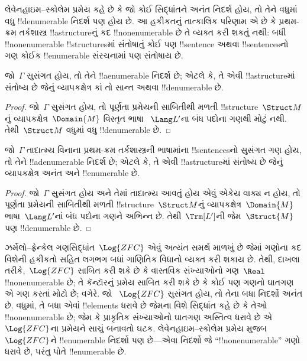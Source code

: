 \documentclass[../../../include/open-logic-section]{subfiles}
\begin{document}

લેવેનહાઇમ--સ્કોલેમ પ્રમેય કહે છે કે જો કોઈ સિદ્ધાંતને અનંત નિદર્શ
હોય, તો તેને વધુમાં વધુ !!{denumerable} નિદર્શ પણ હોય છે. આ હકીકતનું
તાત્કાલિક પરિણામ એ છે કે પ્રથમ-ક્રમ તર્કશાસ્ત્ર !!a{structure}નું કદ
!!{nonenumerable} છે તે વ્યક્ત કરી શકતું નથી: બધી !!{nonenumerable}
!!{structure}sમાં સંતોષાતું કોઈ પણ !!{sentence} અથવા !!{sentence}sનો
ગણ કોઈક !!{enumerable} સંરચનામાં પણ સંતોષાય છે.

\begin{thm}
 જો~$\Gamma$ સુસંગત હોય, તો તેને
!!a{enumerable} નિદર્શ છે; એટલે કે, તે એવી !!a{structure}માં સંતોષ્ય
છે જેનું વ્યાપકક્ષેત્ર કાં તો સાન્ત અથવા !!{denumerable} છે.
\end{thm}

\begin{proof}
જો~$\Gamma$ સુસંગત હોય, તો પૂર્ણતા પ્રમેયની સાબિતીથી મળતી
!!{structure}~$\Struct M$નું વ્યાપકક્ષેત્ર~$\Domain{M}$ વિસ્તૃત ભાષા
~$\Lang L'$ના બંધ પદોના ગણથી મોટું નથી. તેથી~$\Struct M$ વધુમાં વધુ
!!{denumerable} છે.
\end{proof}



\begin{thm}
 જો~$\Gamma$ તાદાત્મ્ય વિનાના પ્રથમ-ક્રમ
તર્કશાસ્ત્રની ભાષામાંના !!{sentence}sનો સુસંગત ગણ હોય, તો તેને
!!a{denumerable} નિદર્શ છે; એટલે કે, તે એવી !!a{structure}માં સંતોષ્ય
છે જેનું વ્યાપકક્ષેત્ર અનંત અને !!{enumerable} છે.
\end{thm}

\begin{proof}
જો~$\Gamma$ સુસંગત હોય અને તેમાં તાદાત્મ્ય આવતું હોય એવું એકેય વાક્ય
ન હોય, તો પૂર્ણતા પ્રમેયની સાબિતીથી મળતી !!{structure}~$\Struct M$નું
વ્યાપકક્ષેત્ર~$\Domain{M}$ ભાષા~$\Lang L'$નાં બંધ પદોના ગણને અભિન્ન છે.
તેથી~$\Trm[L']$ની જેમ~$\Struct{M}$ પણ !!{denumerable} છે.
\end{proof}

\begin{ex}[સ્કોલેમનો વિરોધાભાસ]
ઝર્મેલો--ફ્રેન્કેલ ગણસિદ્ધાંત~$\Log{ZFC}$ એવું અત્યંત સમર્થ માળખું છે
જેમાં ગણોના કદ વિશેની હકીકતો સહિત લગભગ બધાં ગાણિતિક વિધાનો વ્યક્ત કરી
શકાય છે. તેથી, દાખલા તરીકે,~$\Log{ZFC}$ સાબિત કરી શકે છે કે વાસ્તવિક
સંખ્યાઓનો ગણ~$\Real$ !!{nonenumerable} છે; તે કૅન્ટૉરનું પ્રમેય સાબિત
કરી શકે છે કે કોઈ પણ ગણનો ઘાતગણ એ ગણ કરતાં મોટો છે; વગેરે. જો
~$\Log{ZFC}$ સુસંગત હોય, તો તેના બધા નિદર્શો અનંત છે. વધુમાં, તે બધા
એવાં !!{element}s ધરાવે છે જેમના વિશે સિદ્ધાંત કહે છે કે તેઓ
!!{nonenumerable} છે; જેમ કે પ્રાકૃતિક સંખ્યાઓનો ઘાતગણ અસ્તિત્વ ધરાવે
છે એ~$\Log{ZFC}$ના પ્રમેયને સાચું બનાવતો ઘટક. લેવેનહાઇમ--સ્કોલેમ
પ્રમેય મુજબ~$\Log{ZFC}$ને !!{enumerable} નિદર્શો પણ છે—એવા નિદર્શો જે
``!!{nonenumerable}'' ગણો ધરાવે છે, પરંતુ પોતે !!{enumerable} છે.
\end{ex}
\end{document}
